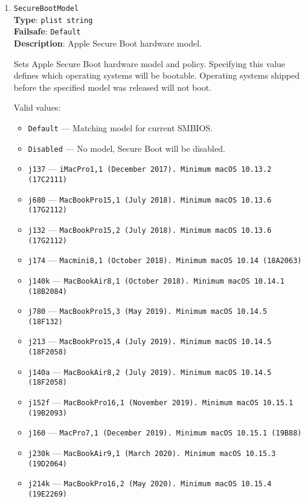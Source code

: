 \documentclass[]{article}
\providecommand{\tightlist}{%
  \setlength{\itemsep}{0pt}\setlength{\parskip}{0pt}}
\begin{document}
\begin{enumerate}
\item \label{secureapplesb}
  \texttt{SecureBootModel}\\
  \textbf{Type}: \texttt{plist\ string}\\
  \textbf{Failsafe}: \texttt{Default}\\
  \textbf{Description}: Apple Secure Boot hardware model.

  Sets Apple Secure Boot hardware model and policy. Specifying
  this value defines which operating systems will be bootable.
  Operating systems shipped before the specified model was released
  will not boot.

  Valid values:

  \begin{itemize}
  \tightlist
  \item \texttt{Default} --- Matching model for current SMBIOS.
  \item \texttt{Disabled} --- No model, Secure Boot will be disabled.
  \item \texttt{j137} --- \texttt{iMacPro1,1 (December 2017). Minimum macOS 10.13.2 (17C2111)}
  \item \texttt{j680} --- \texttt{MacBookPro15,1 (July 2018). Minimum macOS 10.13.6 (17G2112)}
  \item \texttt{j132} --- \texttt{MacBookPro15,2 (July 2018). Minimum macOS 10.13.6 (17G2112)}
  \item \texttt{j174} --- \texttt{Macmini8,1 (October 2018). Minimum macOS 10.14 (18A2063)}
  \item \texttt{j140k} --- \texttt{MacBookAir8,1 (October 2018). Minimum macOS 10.14.1 (18B2084)}
  \item \texttt{j780} --- \texttt{MacBookPro15,3 (May 2019). Minimum macOS 10.14.5 (18F132)}
  \item \texttt{j213} --- \texttt{MacBookPro15,4 (July 2019). Minimum macOS 10.14.5 (18F2058)}
  \item \texttt{j140a} --- \texttt{MacBookAir8,2 (July 2019). Minimum macOS 10.14.5 (18F2058)}
  \item \texttt{j152f} --- \texttt{MacBookPro16,1 (November 2019). Minimum macOS 10.15.1 (19B2093)}
  \item \texttt{j160} --- \texttt{MacPro7,1 (December 2019). Minimum macOS 10.15.1 (19B88)}
  \item \texttt{j230k} --- \texttt{MacBookAir9,1 (March 2020). Minimum macOS 10.15.3 (19D2064)}
  \item \texttt{j214k} --- \texttt{MacBookPro16,2 (May 2020). Minimum macOS 10.15.4 (19E2269)}

\end{itemize}
\end{enumerate}
\end{document}
